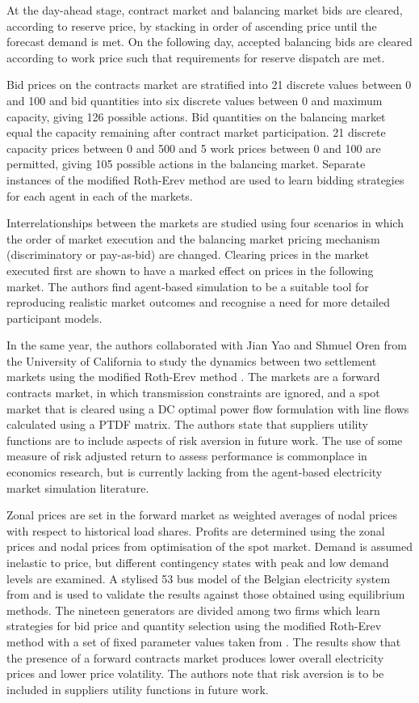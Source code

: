 At the day-ahead stage, contract market and balancing market bids are cleared,
according to reserve price, by stacking in order of ascending price until the
forecast demand is met.  On the following day, accepted balancing bids are
cleared according to work price such that requirements for reserve dispatch are
met.

Bid prices on the contracts market are stratified into 21 discrete values
between 0 and 100 and bid quantities into six discrete values between 0 and
maximum capacity, giving 126 possible actions.  Bid quantities on the balancing
market equal the capacity remaining after contract market participation.  21
discrete capacity prices between 0 and 500 and 5 work prices between 0 and 100
are permitted, giving 105 possible actions in the balancing market.  Separate
instances of the modified Roth-Erev method are used to learn bidding strategies
for each agent in each of the markets.

Interrelationships between the markets are studied using four scenarios in which
the order of market execution and the balancing market pricing mechanism
(discriminatory or pay-as-bid) are changed.  Clearing prices in the market
executed first are shown to have a marked effect on prices in the following
market.  The authors find agent-based simulation to be a suitable tool for
reproducing realistic market outcomes and recognise a need for more detailed
participant models.

In the same year, the authors collaborated with Jian Yao and Shmuel Oren from
the University of California to study the dynamics between two settlement
markets using the modified Roth-Erev method \cite{viet:06}.  The markets are a
forward contracts market, in which transmission constraints are ignored, and a
spot market that is cleared using a DC optimal power flow formulation with line
flows calculated using a PTDF matrix.  The authors state that suppliers utility
functions are to include aspects of risk aversion in future work.  The use of
some measure of risk adjusted return to assess performance is commonplace in
economics research, but is currently lacking from the agent-based electricity
market simulation literature.

Zonal prices are set in the forward market as weighted averages of nodal prices
with respect to historical load shares.  Profits are determined using the zonal
prices and nodal prices from optimisation of the spot market.  Demand is assumed
inelastic to price, but different contingency states with peak and low demand
levels are examined.  A stylised 53 bus model of the Belgian electricity system
from  and  is used to validate the results against
those obtained using equilibrium methods.  The nineteen generators are divided
among two firms which learn strategies for bid price and quantity selection
using the modified Roth-Erev method with a set of fixed parameter values taken
from .  The results show that the presence of a forward
contracts market produces lower overall electricity prices and lower price
volatility. The authors note that risk aversion is to be included in suppliers
utility functions in future work.

